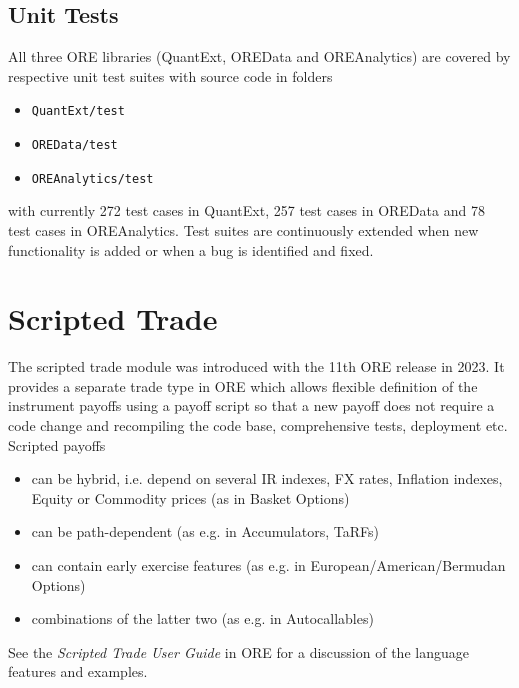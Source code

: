 \documentclass[12pt, a4paper]{report}
\begin{document}
\section{Unit Tests}

All three ORE libraries (QuantExt, OREData and OREAnalytics) are covered by respective unit test
suites with source code in folders
\begin{itemize}
\item {\tt QuantExt/test}
\item {\tt OREData/test}
\item {\tt OREAnalytics/test}
\end{itemize}
with currently 272 test cases in QuantExt, 257 test cases in OREData and 78 test cases in OREAnalytics. Test suites are continuously extended when new functionality is added or when a bug is identified and fixed.

\chapter{Scripted Trade}
\label{sec:scriptedtrade}

The scripted trade module was introduced with the 11th ORE release in 2023. It
provides a separate trade type in ORE which allows flexible definition of the instrument
payoffs using a payoff script so that a new payoff does not require a code change and
recompiling the code base, comprehensive tests, deployment etc. Scripted payoffs 
\begin{itemize}
\item can be hybrid, i.e. depend on several IR indexes, FX rates, Inflation indexes, Equity
  or Commodity prices (as in Basket Options)
\item can be path-dependent (as e.g. in Accumulators, TaRFs)
\item can contain early exercise features (as e.g. in European/American/Bermudan Options)
\item combinations of the latter two (as e.g. in Autocallables)
\end{itemize}
See the {\em Scripted Trade User Guide} in ORE \cite{ORE} for a discussion of the language features
and examples.
\end{document}
